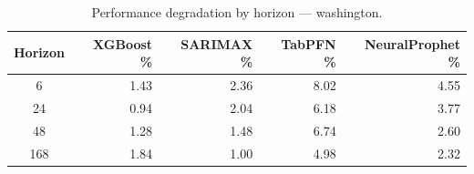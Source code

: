 \begin{table}[h]
\centering
\caption{Performance degradation by horizon — washington.}
\label{tab:degradation_horizon_washington}
\begin{tabular}{crrrr}
\toprule
Horizon & XGBoost \% & SARIMAX \% & TabPFN \% & NeuralProphet \% \\
\midrule
6 & 1.43 & 2.36 & 8.02 & 4.55 \\
24 & 0.94 & 2.04 & 6.18 & 3.77 \\
48 & 1.28 & 1.48 & 6.74 & 2.60 \\
168 & 1.84 & 1.00 & 4.98 & 2.32 \\
\bottomrule
\end{tabular}
\end{table}
